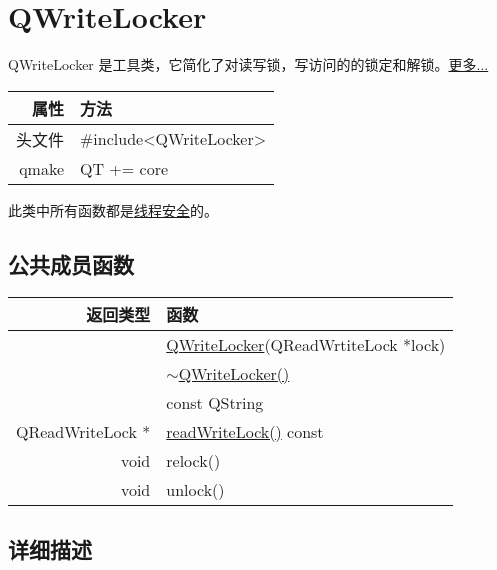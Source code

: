 \chapter{QWriteLocker}

QWriteLocker 是工具类，它简化了对读写锁，写访问的的锁定和解锁。\href{https://github.com/QtDocumentCN/QtDocumentCN/blob/master/Src/W/QWriteLocker/QWriteLocker.md#%E8%AF%A6%E7%BB%86%E6%8F%8F%E8%BF%B0}{更多...}

\begin{tabular}{|r|l|}
	\hline
	属性 & 方法 \\
	\hline
	头文件 & \#include<QWriteLocker>\\      
	\hline
	qmake & QT += core\\      
	\hline
\end{tabular}


\begin{notice}
此类中所有函数都是\href{https://github.com/QtDocumentCN/QtDocumentCN/blob/master/Src/R/Reentrancy_and_Thread-Safety/Reentrancy_and_Thread-Safety.md}{线程安全}的。
\end{notice}

\section{公共成员函数}

\begin{tabular}{|r|l|}
	\hline
	返回类型 & 函数 \\
	\hline
	&	\href{https://github.com/QtDocumentCN/QtDocumentCN/blob/master/Src/W/QWriteLocker/QWriteLocker.md#qwritelockerqwritelockerqreadwritelock-lock}{QWriteLocker}(QReadWrtiteLock *lock) \\
	\hline
	& \href{https://github.com/QtDocumentCN/QtDocumentCN/blob/master/Src/W/QWriteLocker/QWriteLocker.md#qwritelockerqwritelocker}{$\sim$QWriteLocker()} \\
	\hline
		&const QString\\
	\hline
	QReadWriteLock *	&\href{https://github.com/QtDocumentCN/QtDocumentCN/blob/master/Src/W/QWriteLocker/QWriteLocker.md#qreadwritelock-qwritelockerreadwritelock-const}{readWriteLock()}  const\\
	\hline
	void&	relock()\\
	\hline
	void &	unlock()\\
	\hline
\end{tabular}


\section{详细描述}



